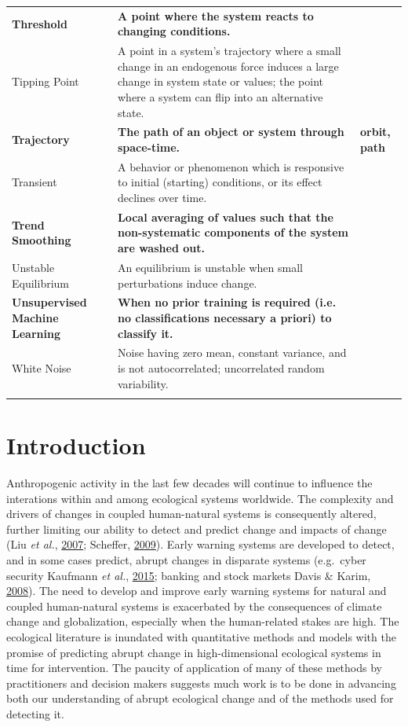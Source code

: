 \documentclass[print]{nuthesis}
\begin{document}
\begin{landscape}
\begin{longtable}{>{\raggedright\arraybackslash}p{12em}>{\raggedright\arraybackslash}p{35em}>{\raggedright\arraybackslash}p{8em}}
\textbf{Threshold} & \textbf{A point where the system reacts to changing conditions.} & \textbf{}\\
Tipping Point & A point in a system's trajectory where a small change in an endogenous force induces a large change in system state or values; the point where a system can flip into an alternative state. & \\
\textbf{Trajectory} & \textbf{The path of an object or system through space-time.} & \textbf{orbit, path}\\
\addlinespace
Transient & A behavior or phenomenon which is responsive to initial (starting) conditions, or its effect declines over time. & \\
\textbf{Trend Smoothing} & \textbf{Local averaging of values such that the non-systematic components of the system are washed out.} & \textbf{}\\
Unstable Equilibrium & An equilibrium is unstable when small perturbations induce change. & \\
\textbf{Unsupervised Machine Learning} & \textbf{When no prior training is required (i.e. no classifications necessary a priori) to classify it.} & \textbf{}\\
White Noise & Noise having zero mean, constant variance, and is not autocorrelated; uncorrelated random variability. & \\*
\end{longtable}
\endgroup{}
\end{landscape}
\hypertarget{intro}{%
\chapter{Introduction}\label{intro}}

Anthropogenic activity in the last few decades will continue to influence the interations within and among ecological systems worldwide. The complexity and drivers of changes in coupled human-natural systems is consequently altered, further limiting our ability to detect and predict change and impacts of change (Liu \emph{et al.}, \protect\hyperlink{ref-liu_complexity_2007}{2007}; Scheffer, \protect\hyperlink{ref-scheffer_critical_2009}{2009}). Early warning systems are developed to detect, and in some cases predict, abrupt changes in disparate systems (e.g.~cyber security Kaufmann \emph{et al.}, \protect\hyperlink{ref-kaufmann2015structural}{2015}; banking and stock markets Davis \& Karim, \protect\hyperlink{ref-davis_comparing_2008}{2008}). The need to develop and improve early warning systems for natural and coupled human-natural systems is exacerbated by the consequences of climate change and globalization, especially when the human-related stakes are high. The ecological literature is inundated with quantitative methods and models with the promise of predicting abrupt change in high-dimensional ecological systems in time for intervention. The paucity of application of many of these methods by practitioners and decision makers suggests much work is to be done in advancing both our understanding of abrupt ecological change and of the methods used for detecting it.
\end{document}
